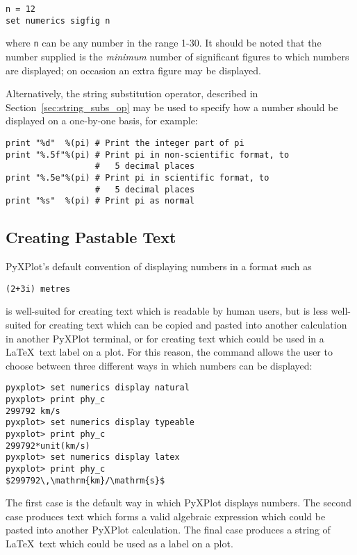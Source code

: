 \begin{verbatim}
n = 12
set numerics sigfig n
\end{verbatim}

\noindent where {\tt n} can be any number in the range 1-30. It should be noted
that the number supplied is the {\it minimum} number of significant figures to
which numbers are displayed; on occasion an extra figure may be displayed.

Alternatively, the string substitution operator, described in
Section~\ref{sec:string_subs_op} may be used to specify how a number should be
displayed on a one-by-one basis, for example:

\begin{verbatim}
print "%d"  %(pi) # Print the integer part of pi
print "%.5f"%(pi) # Print pi in non-scientific format, to
                  #   5 decimal places
print "%.5e"%(pi) # Print pi in scientific format, to
                  #   5 decimal places
print "%s"  %(pi) # Print pi as normal
\end{verbatim}

\subsection{Creating Pastable Text}
\label{sec:pastable}

PyXPlot's default convention of displaying numbers in a format such as

\begin{verbatim}
(2+3i) metres
\end{verbatim}

\noindent is well-suited for creating text which is readable by human users, but
is less well-suited for creating text which can be copied and pasted into
another calculation in another PyXPlot terminal, or for creating text which
could be used in a \LaTeX\ text label on a plot. For this reason, the
 command allows the user to choose between three
different ways in which numbers can be displayed:

\begin{verbatim}
pyxplot> set numerics display natural
pyxplot> print phy_c
299792 km/s
pyxplot> set numerics display typeable
pyxplot> print phy_c
299792*unit(km/s)
pyxplot> set numerics display latex
pyxplot> print phy_c
$299792\,\mathrm{km}/\mathrm{s}$
\end{verbatim}

The first case is the default way in which PyXPlot displays numbers. The second
case produces text which forms a valid algebraic expression which could be
pasted into another PyXPlot calculation. The final case produces a string of
\LaTeX\ text which could be used as a label on a plot.

